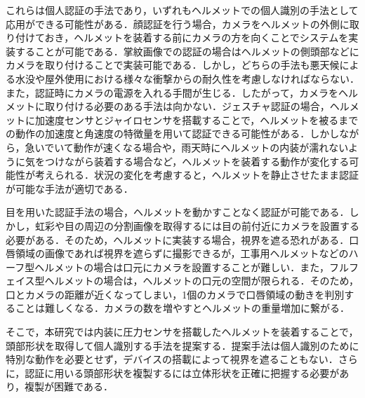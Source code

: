 \documentclass[Japanese,noauthor]{dicomopapers}
\begin{document}
これらは個人認証の手法であり，いずれもヘルメットでの個人識別の手法として応用ができる可能性がある．顔認証を行う場合，カメラをヘルメットの外側に取り付けておき，ヘルメットを装着する前にカメラの方を向くことでシステムを実装することが可能である．掌紋画像での認証の場合はヘルメットの側頭部などにカメラを取り付けることで実装可能である．しかし，どちらの手法も悪天候による水没や屋外使用における様々な衝撃からの耐久性を考慮しなければならない．また，認証時にカメラの電源を入れる手間が生じる．したがって，カメラをヘルメットに取り付ける必要のある手法は向かない．ジェスチャ認証の場合，ヘルメットに加速度センサとジャイロセンサを搭載することで，ヘルメットを被るまでの動作の加速度と角速度の特徴量を用いて認証できる可能性がある．しかしながら，急いでいて動作が速くなる場合や，雨天時にヘルメットの内装が濡れないように気をつけながら装着する場合など，ヘルメットを装着する動作が変化する可能性が考えられる．状況の変化を考慮すると，ヘルメットを静止させたまま認証が可能な手法が適切である．\par

目を用いた認証手法の場合，ヘルメットを動かすことなく認証が可能である．しかし，虹彩や目の周辺の分割画像を取得するには目の前付近にカメラを設置する必要がある．そのため，ヘルメットに実装する場合，視界を遮る恐れがある．口唇領域の画像であれば視界を遮らずに撮影できるが，工事用ヘルメットなどのハーフ型ヘルメットの場合は口元にカメラを設置することが難しい．また，フルフェイス型ヘルメットの場合は，ヘルメットの口元の空間が限られる．そのため，口とカメラの距離が近くなってしまい，1個のカメラで口唇領域の動きを判別することは難しくなる．カメラの数を増やすとヘルメットの重量増加に繋がる．\par

そこで，本研究では内装に圧力センサを搭載したヘルメットを装着することで，頭部形状を取得して個人識別する手法を提案する．提案手法は個人識別のために特別な動作を必要とせず，デバイスの搭載によって視界を遮ることもない．さらに，認証に用いる頭部形状を複製するには立体形状を正確に把握する必要があり，複製が困難である．
\end{document}
